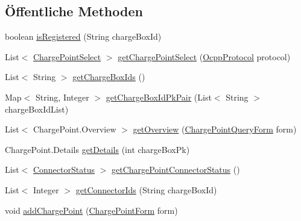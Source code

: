 \subsection*{Öffentliche Methoden}
\begin{DoxyCompactItemize}
\item 
boolean \hyperlink{interfacede_1_1rwth_1_1idsg_1_1steve_1_1repository_1_1_charge_point_repository_a4824062c6ff2dfcf9490ffb71484bb83}{is\-Registered} (String charge\-Box\-Id)
\item 
List$<$ \hyperlink{classde_1_1rwth_1_1idsg_1_1steve_1_1repository_1_1dto_1_1_charge_point_select}{Charge\-Point\-Select} $>$ \hyperlink{interfacede_1_1rwth_1_1idsg_1_1steve_1_1repository_1_1_charge_point_repository_ad8617028d70a274b51b9fe7d04feee72}{get\-Charge\-Point\-Select} (\hyperlink{enumde_1_1rwth_1_1idsg_1_1steve_1_1ocpp_1_1_ocpp_protocol}{Ocpp\-Protocol} protocol)
\item 
List$<$ String $>$ \hyperlink{interfacede_1_1rwth_1_1idsg_1_1steve_1_1repository_1_1_charge_point_repository_a0f9a9d616c82118e9292f1dd0bb8fd5e}{get\-Charge\-Box\-Ids} ()
\item 
Map$<$ String, Integer $>$ \hyperlink{interfacede_1_1rwth_1_1idsg_1_1steve_1_1repository_1_1_charge_point_repository_ac07b02af508e0e81d53c90802fca149f}{get\-Charge\-Box\-Id\-Pk\-Pair} (List$<$ String $>$ charge\-Box\-Id\-List)
\item 
List$<$ Charge\-Point.\-Overview $>$ \hyperlink{interfacede_1_1rwth_1_1idsg_1_1steve_1_1repository_1_1_charge_point_repository_ad9223548ece03ca151c916298b19be57}{get\-Overview} (\hyperlink{classde_1_1rwth_1_1idsg_1_1steve_1_1web_1_1dto_1_1_charge_point_query_form}{Charge\-Point\-Query\-Form} form)
\item 
Charge\-Point.\-Details \hyperlink{interfacede_1_1rwth_1_1idsg_1_1steve_1_1repository_1_1_charge_point_repository_a27364670868b5a47dd02b26f6b9e8058}{get\-Details} (int charge\-Box\-Pk)
\item 
List$<$ \hyperlink{classde_1_1rwth_1_1idsg_1_1steve_1_1repository_1_1dto_1_1_connector_status}{Connector\-Status} $>$ \hyperlink{interfacede_1_1rwth_1_1idsg_1_1steve_1_1repository_1_1_charge_point_repository_ab1beb661ec11861ebaf2e43b003cb6d8}{get\-Charge\-Point\-Connector\-Status} ()
\item 
List$<$ Integer $>$ \hyperlink{interfacede_1_1rwth_1_1idsg_1_1steve_1_1repository_1_1_charge_point_repository_aed97e9bbcfd11a66f6e86bc52e51cbd5}{get\-Connector\-Ids} (String charge\-Box\-Id)
\item 
void \hyperlink{interfacede_1_1rwth_1_1idsg_1_1steve_1_1repository_1_1_charge_point_repository_ac74f3660f94697edd12eca4d3f2f5e6a}{add\-Charge\-Point} (\hyperlink{classde_1_1rwth_1_1idsg_1_1steve_1_1web_1_1dto_1_1_charge_point_form}{Charge\-Point\-Form} form)

\end{DoxyCompactItemize}
